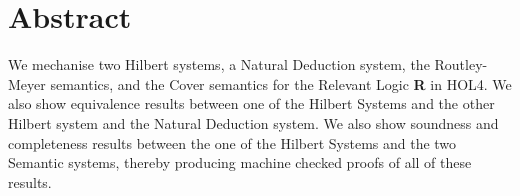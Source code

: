\chapter*{Abstract}
\vspace{-1em}

We mechanise two Hilbert systems, a Natural Deduction system, the Routley-Meyer semantics, and the Cover semantics for the Relevant Logic \textbf{R} in HOL4. 
We also show equivalence results between one of the Hilbert Systems and the other Hilbert system and the Natural Deduction system. We also show soundness and completeness results between the one of the Hilbert Systems and the two Semantic systems, thereby producing machine checked proofs of all of these results. 